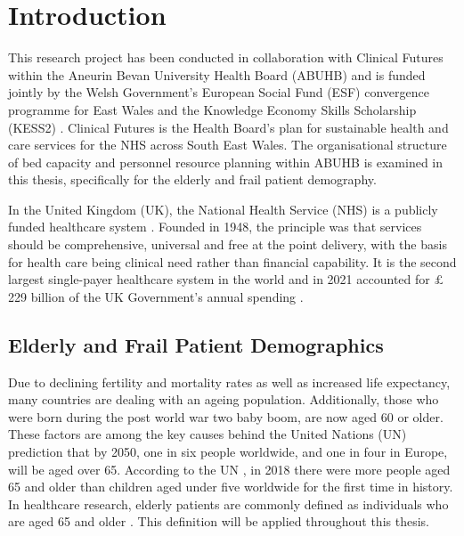 \documentclass[../thesis.tex]{subfiles}
\begin{document}
\chapter{Introduction}\label{chp:Introduction}

This research project has been conducted in collaboration with Clinical Futures within the Aneurin Bevan University Health Board (ABUHB) \cite{UniAneurinBevanHealthBoard} and is funded jointly by the Welsh Government's European Social Fund (ESF) convergence programme for East Wales and the Knowledge Economy Skills Scholarship (KESS2) \cite{KESS2023}. Clinical Futures is the Health Board's plan for sustainable health and care services for the NHS across South East Wales. The organisational structure of bed capacity and personnel resource planning within ABUHB is examined in this thesis, specifically for the elderly and frail patient demography.

In the United Kingdom (UK), the National Health Service (NHS) is a publicly funded healthcare system \cite{Welch2018}. Founded in 1948, the principle was that services should be comprehensive, universal and free at the point delivery, with the basis for health care being clinical need rather than financial capability. It is the second largest single-payer healthcare system in the world and in 2021 accounted for $\pounds$229 billion of the UK Government's annual spending \cite{ONS2022a}.


\section{Elderly and Frail Patient Demographics}\label{sec:elderlyfrail}
Due to declining fertility and mortality rates as well as increased life expectancy, many countries are dealing with an ageing population. Additionally, those who were born during the post world war two baby boom, are now aged 60 or older. These factors are among the key causes behind the United Nations 
(UN) prediction that by 2050, one in six people worldwide, and one in four in Europe, will be aged over 65. According to the UN \cite{UN3}, in 2018 there were more people aged 65 and older than children aged under five worldwide for the first time in history. In healthcare research, elderly patients are commonly defined as individuals who are aged 65 and older \cite{Crews2006,GOV.UK2001,NHSEngland,Orimo2006}. This definition will be applied throughout this thesis. 
\end{document}
